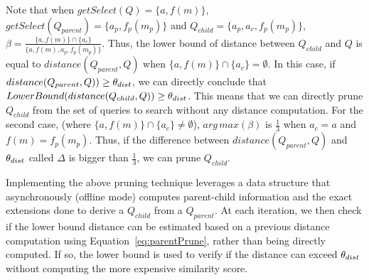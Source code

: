 \sloppy
Note that when $ getSelect(Q) = \{a, f(m)\}$, $ getSelect(Q_{parent}) = \{ a_p, f_p(m_p)\}$ and $  Q_{child} = \{a_p, a_c, f_p(m_p)\}$, $\beta= \frac{  \{a, f(m) \}  \cap \{ a_c \}   }{\{ a, f(m), a_p, f_p(m_p) \} }$. %
Thus, the lower bound of distance between $Q_{child}$ and $Q$ is equal to $ distance(Q_{parent},Q)$ when $ \{ a, f(m) \} \cap \{ a_c \}= \emptyset$.
 In this case, if $ distance(Q_{parent},Q)) \geq \theta_{dist}$, we can directly conclude that $ LowerBound(distance(Q_{child},Q)) \geq \theta_{dist}$. This means that we can directly prune $Q_{child}$ from the set of queries to search without any distance computation. 
For the second case, (where $ \{ a, f(m) \} \cap \{ a_c \} \neq \emptyset$), $ {arg\,max} (\beta)$ is $\frac{1}{3}$ when $ a_c=a$ and  $ f(m)=f_p(m_p)$. Thus, if the difference between $ distance(Q_{parent},Q)$ and $ \theta_{dist}$ called $ \Delta$ is bigger than $\frac{1}{3}$, we can prune $Q_{child}$.

Implementing the above pruning technique leverages a data structure that asynchronously (offline mode) computes parent-child information and the exact extensions done to derive a $Q_{child}$ from a $Q_{parent}$. At each iteration, we then check if the lower bound distance can be estimated based on a previous distance computation using Equation~\ref{eq:parentPrune}, rather than being directly computed. If so, the lower bound is used to verify if the distance can exceed $\theta_{dist}$ without computing the more expensive similarity score. 



